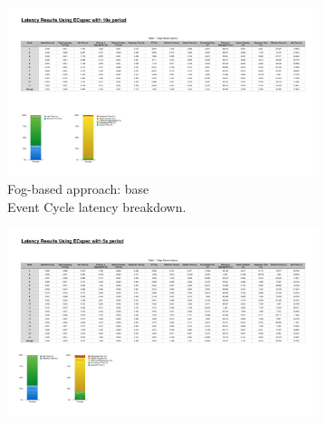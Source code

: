 \begin{figure}[ht!]
 \centering
 \begin{subfigure}{.5\textwidth}
   \centering
   \includegraphics[height=\linewidth]{./images/edge_ecspec_breakdown}
   \caption{Fog-based approach: base\\Event Cycle latency breakdown.}
   \label{fig:ecspec_base}
 \end{subfigure}%
 \begin{subfigure}{.5\textwidth}
   \centering
   \includegraphics[height=\linewidth]{./images/edge_ecspecf_breakdown}

\end{subfigure}
\end{figure}
